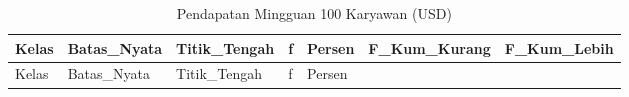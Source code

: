 \documentclass[
  indonesian,
  letterpaper,
]{book}
\begin{document}
\begin{longtable}[]{@{}
  >{\raggedright\arraybackslash}p{}
  >{\raggedright\arraybackslash}p{}
  >{\raggedleft\arraybackslash}p{}
  >{\raggedleft\arraybackslash}p{}
  >{\raggedleft\arraybackslash}p{}
  >{\raggedleft\arraybackslash}p{}
  >{\raggedleft\arraybackslash}p{}@{}}
\caption{Pendapatan Mingguan 100 Karyawan (USD)}\tabularnewline
\toprule\noalign{}
\begin{minipage}[b]{\linewidth}\raggedright
Kelas
\end{minipage} & \begin{minipage}[b]{\linewidth}\raggedright
Batas\_Nyata
\end{minipage} & \begin{minipage}[b]{\linewidth}\raggedleft
Titik\_Tengah
\end{minipage} & \begin{minipage}[b]{\linewidth}\raggedleft
f
\end{minipage} & \begin{minipage}[b]{\linewidth}\raggedleft
Persen
\end{minipage} & \begin{minipage}[b]{\linewidth}\raggedleft
F\_Kum\_Kurang
\end{minipage} & \begin{minipage}[b]{\linewidth}\raggedleft
F\_Kum\_Lebih
\end{minipage} \\
\midrule\noalign{}
\endfirsthead
\toprule\noalign{}
\begin{minipage}[b]{\linewidth}\raggedright
Kelas
\end{minipage} & \begin{minipage}[b]{\linewidth}\raggedright
Batas\_Nyata
\end{minipage} & \begin{minipage}[b]{\linewidth}\raggedleft
Titik\_Tengah
\end{minipage} & \begin{minipage}[b]{\linewidth}\raggedleft
f
\end{minipage} & \begin{minipage}[b]{\linewidth}\raggedleft
Persen
\end{minipage} & \begin{minipage}[b]{\linewidth}\raggedleft

\end{minipage}
\end{longtable}
\end{document}
